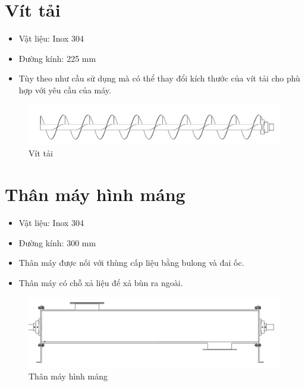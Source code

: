 \section{Vít tải}
\begin{itemize}
    \item Vật liệu: Inox 304
    \item Đường kính: 225 mm
    \item Tùy theo như cầu sử dụng mà có thể thay đổi kích thước của vít tải cho phù hợp với yêu cầu của máy.
\end{itemize}
\begin{figure}[H]
    \centering
    \includegraphics[width=1\textwidth]{pictures/vit.png}
    \caption{Vít tải}
\end{figure}

\section{Thân máy hình máng}
\begin{itemize}
    \item Vật liệu: Inox 304
    \item Đường kính: 300 mm
    \item Thân máy được nối với thùng cấp liệu bằng bulong và đai ốc.
    \item Thân máy có chỗ xả liệu để xả bùn ra ngoài.
\end{itemize}
\begin{figure}[H]
    \centering
    \includegraphics[width=1\textwidth]{pictures/than.png}
    \caption{Thân máy hình máng}
\end{figure}

